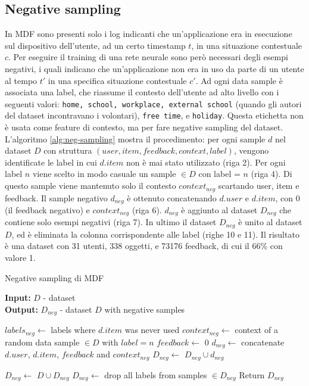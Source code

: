 \documentclass[12pt,italian]{report}
\begin{document}
\subsection{Negative sampling}
In MDF sono presenti solo i log indicanti che un'applicazione era in esecuzione sul dispositivo dell'utente, ad un certo timestamp $t$, in una situazione contestuale $c$. Per eseguire il training di una rete neurale sono però necessari degli esempi negativi, i quali indicano che un'applicazione non era in uso da parte di un utente al tempo $t'$ in una specifica situazione contestuale $c'$. Ad ogni data sample è associata una label, che riassume il contesto dell'utente ad alto livello con i seguenti valori: \texttt{home, school, workplace, external school} (quando gli autori del dataset incontravano i volontari), \texttt{free time}, e \texttt{holiday}. Questa etichetta non è usata come feature di contesto, ma per fare negative sampling del dataset. 
L'algoritmo \ref{alg:neg-sampling} mostra il procedimento: per ogni sample $d$ nel dataset $D$ con struttura $(user, item, feedback, context, label)$, vengono identificate le label in cui $d.item$ non è mai stato utilizzato (riga 2). Per ogni label $n$ viene scelto in modo casuale un sample $\in D$ con label = $n$ (riga 4). Di questo sample viene mantenuto solo il contesto $context_{neg}$ scartando user, item e feedback. Il sample negativo $d_{neg}$ è ottenuto concatenando $d.user$ e $d.item$, con 0 (il feedback negativo) e $context_{neg}$ (riga 6).  $d_{neg}$ è aggiunto al dataset $D_{neg}$ che contiene solo esempi negativi (riga 7). In ultimo il dataset $D_{neg}$ è unito al dataset $D$, ed è eliminata la colonna corrispondente alle label (righe 10 e 11). Il risultato è una dataset con 31 utenti, 338 oggetti, e 73176 feedback, di cui il 66\% con valore 1.

\begin{algorithm}
\caption{Negative sampling di MDF}
\label{alg:neg-sampling}
 \hspace*{\algorithmicindent} \textbf{Input:} $D$ - dataset \\
 \hspace*{\algorithmicindent} \textbf{Output:} $D_{neg}$ - dataset 
$D$ with negative samples \\ 
\begin{algorithmic}[1]

	\STATE $labels_{neg} \leftarrow$ labels where $d.item$ was never used
		\STATE $context_{neg} \leftarrow$ context of a random data sample  $\in D$ with $label = n$
		\STATE $feedback \leftarrow$ 0
		\STATE $d_{neg} \leftarrow$ concatenate $d.user$, $d.item$, $feedback$ and $context_{neg}$
		\STATE $D_{neg} \leftarrow$ $D_{neg} \cup d_{neg}$ 
		
	\ENDFOR
\ENDFOR

\STATE $D_{neg} \leftarrow$ $D \cup D_{neg}$
\STATE $D_{neg} \leftarrow$ drop all labels from samples $ \in D_{neg}$
\STATE Return $D_{neg}$

\end{algorithmic}
\end{algorithm}
\end{document}
